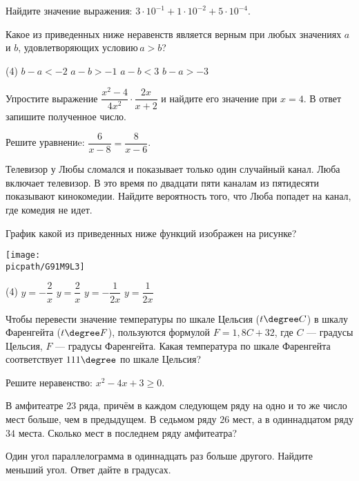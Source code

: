 \begin{class}[number=3]
	\begin{listofex}
		\item Найдите значение выражения: \(3\cdot10^{-1}+1\cdot10^{-2}+5\cdot10^{-4}\).
		\item Какое из приведенных ниже неравенств является верным при любых значениях \( a \) и \( b \), удовлетворяющих условию \( a>b \)?
		\begin{tasks}(4)
			\task \( b-a<-2 \)
			\task \( a-b>-1 \)
			\task \( a-b<3 \)
			\task \( b-a>-3 \)
		\end{tasks}
		\item Упростите выражение \( \dfrac{x^2-4}{4x^2}\cdot\dfrac{2x}{x+2} \) и найдите его значение при \( x=4 \). В ответ запишите полученное число.
		\item Решите уравнениe: \(\dfrac{6}{x-8}=\dfrac{8}{x-6}\).
		\item Телевизор у Любы сломался и показывает только один случайный канал. Люба включает телевизор. В это время по двадцати пяти каналам из пятидесяти показывают кинокомедии. Найдите вероятность того, что Люба попадет на канал, где комедия не идет.
		\item График какой из приведенных ниже функций изображен на рисунке?
		\begin{center}
			\texttt{[image: \\picpath/G91M9L3]}
		\end{center}
		\begin{tasks}(4)
			\task \( y=-\dfrac{2}{x} \)
			\task \( y=\dfrac{2}{x} \)
			\task \( y=-\dfrac{1}{2x} \)
			\task \( y=\dfrac{1}{2x} \)
		\end{tasks}
		\item Чтобы перевести значение температуры по шкале Цельсия (\( t\degree C \)) в шкалу Фаренгейта (\( t\degree F \)), пользуются формулой \( F=1,8C+32 \), где \( C \) --- градусы Цельсия, \( F \) --- градусы Фаренгейта. Какая температура по шкале Фаренгейта соответствует \( 111\degree \) по шкале Цельсия?
		\item Решите неравенство: \( x^2-4x+3\ge0 \).
		\item В амфитеатре \( 23 \) ряда, причём в каждом следующем ряду на одно и то же число мест больше, чем в предыдущем. В седьмом ряду \( 26 \) мест,	а в одиннадцатом ряду \( 34 \) места. Сколько мест в последнем ряду амфитеатра?
		\item Один угол параллелограмма в одиннадцать раз больше другого. Найдите меньший угол. Ответ дайте в градусах.

\end{listofex}
\end{class}
